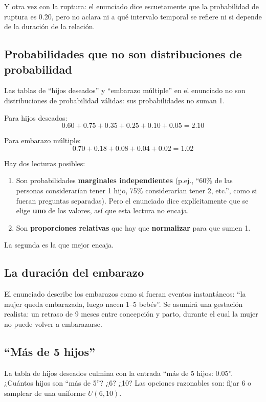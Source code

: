 \documentclass[12pt,a4paper]{article}
\begin{document}
Y otra vez con la ruptura: el enunciado dice escuetamente que la probabilidad de ruptura es 0.20, pero no aclara ni a qué intervalo temporal se refiere ni si depende de la duración de la relación.

\subsection{Probabilidades que no son distribuciones de probabilidad}

Las tablas de ``hijos deseados'' y ``embarazo múltiple'' en el enunciado no son distribuciones de probabilidad válidas: sus probabilidades no suman 1.

Para hijos deseados:
\[
0.60 + 0.75 + 0.35 + 0.25 + 0.10 + 0.05 = 2.10
\]

Para embarazo múltiple:
\[
0.70 + 0.18 + 0.08 + 0.04 + 0.02 = 1.02
\]

Hay dos lecturas posibles:

\begin{enumerate}
    \item Son probabilidades \textbf{marginales independientes} (p.ej., ``60\% de las personas considerarían tener 1 hijo, 75\% considerarían tener 2, etc.'', como si fueran preguntas separadas). Pero el enunciado dice explícitamente que se elige \textbf{uno} de los valores, así que esta lectura no encaja.
    \item Son \textbf{proporciones relativas} que hay que \textbf{normalizar} para que sumen 1.
\end{enumerate}

La segunda es la que mejor encaja.

\subsection{La duración del embarazo}

El enunciado describe los embarazos como si fueran eventos instantáneos: ``la mujer queda embarazada, luego nacen 1--5 bebés''. Se asumirá una gestación realista: un retraso de 9 meses entre concepción y parto, durante el cual la mujer no puede volver a embarazarse.

\subsection{``Más de 5 hijos''}

La tabla de hijos deseados culmina con la entrada ``más de 5 hijos: 0.05''. ¿Cuántos hijos son ``más de 5''? ¿6? ¿10? Las opciones razonables son: fijar 6 o samplear de una uniforme $U(6, 10)$.
\end{document}
